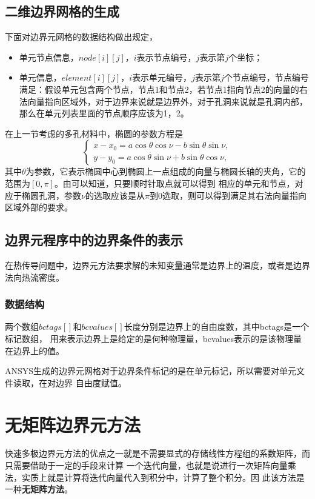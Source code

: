 \subsection{二维边界网格的生成}
下面对边界元网格的数据结构做出规定，
\begin{itemize}
	\item 单元节点信息，$node[i][j]$，$i$表示节点编号，$j$表示第$j$个坐标；
	\item 单元信息，$element[i][j]$，$i$表示单元编号，$j$表示第$j$个节点编号，节点编号满足：假设单元包含两个节点，节点1和节点2，若节点1指向节点2的向量的右法向量指向区域外，对于边界来说就是边界外，对于孔洞来说就是孔洞内部，那么在单元列表里面的节点顺序应该为1，2。
\end{itemize}

在上一节考虑的多孔材料中，椭圆的参数方程是
\[\left\{ {\begin{array}{*{20}{c}}
  {x - {x_{\text{0}}} = a\cos \theta \cos \nu  - b\sin \theta \sin \nu ,} \\ 
  {y - {y_{\text{0}}} = a\cos \theta \sin \nu  + b\sin \theta \cos \nu ,} 
\end{array}} \right.\]
其中$\theta$为参数，它表示椭圆中心到椭圆上一点组成的向量与椭圆长轴的夹角，它的范围为$[0,\pi]$。由可以知道，只要顺时针取点就可以得到
相应的单元和节点，对应于椭圆孔洞，参数$\nu$的选取应该是从$\pi$到$0$选取，则可以得到满足其右法向量指向区域外部的要求。


\subsection{边界元程序中的边界条件的表示}
在热传导问题中，边界元方法要求解的未知变量通常是边界上的温度，或者是边界法向热流密度。
\subsubsection{数据结构}
两个数组$bctags[]$和$bcvalues[]$长度分别是边界上的自由度数，其中bctags是一个标记数组，
用来表示边界上是给定的是何种物理量，bcvalues表示的是该物理量在边界上的值。

ANSYS生成的边界元网格对于边界条件标记的是在单元标记，所以需要对单元文件读取，在对边界
自由度赋值。




\section{无矩阵边界元方法}

快速多极边界元方法的优点之一就是不需要显式的存储线性方程组的系数矩阵，而只需要借助于一定的手段来计算
一个迭代向量，也就是说进行一次矩阵向量乘法，实质上就是计算将迭代向量代入到积分中，计算了整个积分。因
此该方法是一种\textbf{无矩阵方法}。

